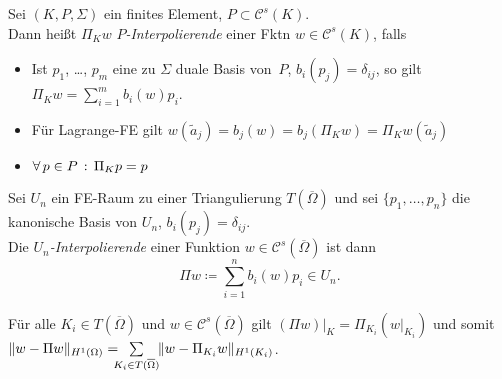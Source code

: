 \documentclass{cheat-sheet}
\newcommand{\Cont}{\mathcal{C}} %
\newcommand{\clos}[1]{\overline{#1}} %
\newcommand{\cOmega}{\clos{\Omega}} %
\begin{document}
\begin{defn}
  Sei $(K, P, \Sigma)$ ein finites Element, $P \subset \Cont^s(K)$. \\
  Dann heißt $\Pi_K w$ \emph{$P$-Interpolierende} einer Fktn $w \in \Cont^s(K)$, falls
  \begin{itemize}
  \end{itemize}
\end{defn}

\begin{bem}
  \begin{itemize}
    \item Ist $p_1$, \ldots, $p_m$ eine zu $\Sigma$ duale Basis von~$P$, \dh{} $b_i(p_j) = \delta_{ij}$, so gilt $\Pi_K w = {\sum}_{i=1}^m b_i(w) p_i$.
    \item Für Lagrange-FE gilt \enspace
    $w(\tilde{a}_j) = b_j(w) = b_j(\Pi_K w) = \Pi_K w(\tilde{a}_j)$
    \item $\forall \, {p \in P} \,:\, \Pi_K p = p$
  \end{itemize}
\end{bem}


\begin{defn}
  Sei $U_n$ ein FE-Raum zu einer Triangulierung $T(\cOmega)$ und sei $\{ p_1, \ldots, p_n \}$ die kanonische Basis von $U_n$, \dh{} $b_i(p_j) = \delta_{ij}$. \\
  Die \emph{$U_n$-Interpolierende} einer Funktion $w \in \Cont^s(\cOmega)$ ist dann
  \[
    \Pi w \coloneqq \sum_{i=1}^n b_i(w) p_i \in U_n.
  \]
\end{defn}

\begin{lem}
  Für alle $K_i \in T(\cOmega)$ und $w \in \Cont^s(\cOmega)$ gilt $(\Pi w) |_K = \Pi_{K_i} (w|_{K_i})$ und somit $\norm{w - \Pi w}_{H^1(\Omega)} = \enspace \sum_{\mathclap{K_i \in T(\cOmega)}} \quad \norm{w - \Pi_{K_i} w}_{H^1(K_i)}$.
\end{lem}
\end{document}
